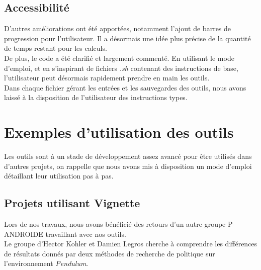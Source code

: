 \documentclass[12pt]{article}
\begin{document}

\newpage
\subsection{Accessibilité}

D’autres améliorations ont été apportées, notamment l’ajout de barres de progression pour l’utilisateur. Il a désormais une idée plus précise de la quantité de temps restant pour les calculs. \\

De plus, le code a été clarifié et largement commenté. En utilisant le mode d'emploi, et en s'inspirant de fichiers \emph{.sh} contenant des instructions de base, l'utilisateur peut désormais rapidement prendre en main les outils. \\

Dans chaque fichier gérant les entrées et les sauvegardes des outils, nous avons laissé à la disposition de l'utilisateur des instructions types. \\

\section{Exemples d'utilisation des outils}

Les outils sont à un stade de développement assez avancé pour être utilisés dans d'autres projets, on rappelle que nous avons mis à disposition un mode d'emploi détaillant leur utilisation pas à pas. \\

\subsection{Projets utilisant Vignette}

Lors de nos travaux, nous avons bénéficié des retours d'un autre groupe P-ANDROIDE travaillant avec nos outils. \\

Le groupe d'Hector Kohler et Damien Legros cherche à comprendre les différences de résultats donnés par deux méthodes de recherche de politique sur l'environnement \emph{Pendulum}. \\
\end{document}
